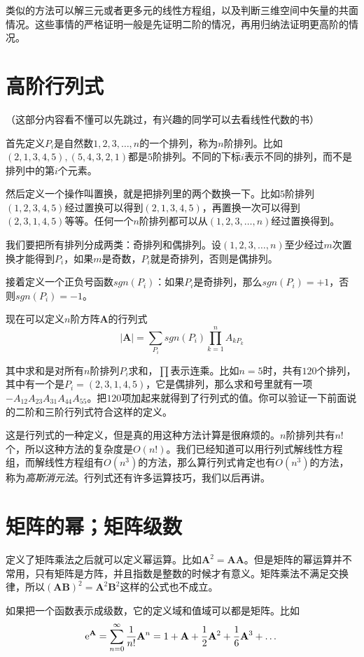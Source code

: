 类似的方法可以解三元或者更多元的线性方程组，以及判断三维空间中矢量的共面情况。这些事情的严格证明一般是先证明二阶的情况，再用归纳法证明更高阶的情况。
\section{高阶行列式}
（这部分内容看不懂可以先跳过，有兴趣的同学可以去看线性代数的书）

首先定义$P_i$是自然数$1, 2, 3, \dots, n$的一个排列，称为$n$阶排列。比如$(2, 1, 3, 4, 5), (5, 4, 3, 2, 1)$都是$5$阶排列。不同的下标$i$表示不同的排列，而不是排列中的第$i$个元素。

然后定义一个操作叫置换，就是把排列里的两个数换一下。比如$5$阶排列$(1, 2, 3, 4, 5)$经过置换可以得到$(2, 1, 3, 4, 5)$，再置换一次可以得到$(2, 3, 1, 4, 5)$等等。任何一个$n$阶排列都可以从$(1, 2, 3, \dots, n)$经过置换得到。

我们要把所有排列分成两类：奇排列和偶排列。设$(1, 2, 3, \dots, n)$至少经过$m$次置换才能得到$P_i$，如果$m$是奇数，$P_i$就是奇排列，否则是偶排列。

接着定义一个正负号函数$sgn(P_i)$：如果$P_i$是奇排列，那么$sgn(P_i)=+1$，否则$sgn(P_i)=-1$。

现在可以定义$n$阶方阵$\mathbf{A}$的行列式
\begin{equation*}
|\mathbf{A}|=\sum_{P_i} sgn(P_i) \prod_{k=1}^n A_{k P_k}
\end{equation*}

其中求和是对所有$n$阶排列$P_i$求和，$\prod$表示连乘。比如$n=5$时，共有$120$个排列，其中有一个是$P_i=(2, 3, 1, 4, 5)$，它是偶排列，那么求和号里就有一项$-A_{1 2} A_{2 3} A_{3 1} A_{4 4} A_{5 5}$。把$120$项加起来就得到了行列式的值。你可以验证一下前面说的二阶和三阶行列式符合这样的定义。

这是行列式的一种定义，但是真的用这种方法计算是很麻烦的。$n$阶排列共有$n!$个，所以这种方法的复杂度是$O(n!)$。我们已经知道可以用行列式解线性方程组，而解线性方程组有$O(n^3)$的方法，那么算行列式肯定也有$O(n^3)$的方法，称为\emph{高斯消元法}。行列式还有许多运算技巧，我们以后再讲。
\section{矩阵的幂；矩阵级数}
定义了矩阵乘法之后就可以定义幂运算。比如$\mathbf{A}^2=\mathbf{A} \mathbf{A}$。但是矩阵的幂运算并不常用，只有矩阵是方阵，并且指数是整数的时候才有意义。矩阵乘法不满足交换律，所以$(\mathbf{A} \mathbf{B})^2=\mathbf{A}^2 \mathbf{B}^2$这样的公式也不成立。

如果把一个函数表示成级数，它的定义域和值域可以都是矩阵。比如
\begin{equation*}
\mathrm{e}^\mathbf{A}=\sum_{n=0}^{\infty}\frac{1}{n!}\mathbf{A}^n=1+\mathbf{A}+\frac{1}{2}\mathbf{A}^2+\frac{1}{6}\mathbf{A}^3+\dots
\end{equation*}

